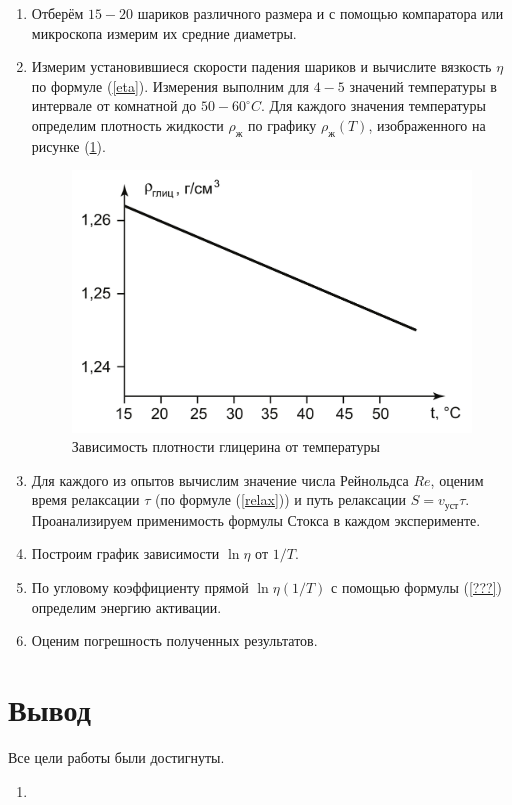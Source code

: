 \documentclass[a4paper,12pt]{article} %
\begin{document}
\begin{enumerate}
  \item Отберём $15-20$ шариков различного размера и с помощью компаратора или микроскопа измерим их средние диаметры.
  
  \item Измерим установившиеся скорости падения шариков и вычислите вязкость $\eta$ по формуле (\ref{eta}). Измерения выполним для $4-5$ значений температуры в интервале от комнатной до $50-60 ^\circ C$. Для каждого значения температуры определим плотность жидкости $\rho_\text{ж}$ по графику $\rho_\text{ж} (T)$, изображенного на рисунке (\ref{fig:rho_T}).
  
	\begin{figure}[h!]
		\centering
		\includegraphics[scale = 0.35]{rho_t.png}
		\caption{Зависимость плотности глицерина от температуры}
		\label{fig:rho_T}
	\end{figure}
  
  \item Для каждого из опытов вычислим значение числа Рейнольдса $Re$, оценим время релаксации $\tau$ (по формуле (\ref{relax})) и путь релаксации $S = v_\text{уст} \tau$. Проанализируем применимость формулы Стокса в каждом эксперименте.
  
  \item Построим график зависимости $\ln \eta$ от $1/T$.
  
  \item По угловому коэффициенту прямой $\ln \eta (1/T)$ с помощью формулы (\ref{???}) определим энергию активации. 
  
	\item Оценим погрешность полученных результатов.
\end{enumerate}

\section*{Вывод}

Все цели работы были достигнуты.

\begin{enumerate}
	\item 
\end{enumerate}
\end{document}
